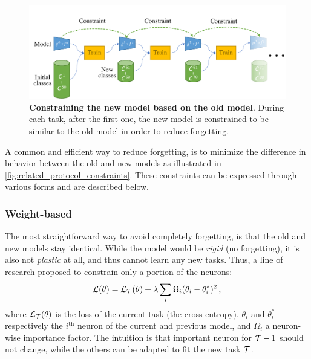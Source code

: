 \begin{figure}[tb]
      \begin{center}
            \includegraphics[width=1.0\linewidth]{images/related/constraints}
      \end{center}
      \caption{\textbf{Constraining the new model based on the old model}. During each task, after
            the first one, the new model is constrained to be similar to the old model in order to reduce
            forgetting.}
      \label{fig:related_protocol_constraints}
\end{figure}

A common and efficient way to reduce forgetting, is to minimize the difference in behavior between
the old and new models as illustrated in \autoref{fig:related_protocol_constraints}. These constraints can be
expressed through various forms and are described below.

\subsubsection{Weight-based}
\label{sec:related_regul_weight}


The most straightforward way to avoid completely forgetting, is that the old and new
models stay identical. While the model would be \textit{rigid} (no forgetting), it is also not
\textit{plastic} at all, and thus cannot learn any new tasks. Thus, a line of research proposed to
constrain only a portion of the neurons:
%
\begin{equation}
      \mathcal{L}(\theta) = \mathcal{L}_{\mathcal{T}}(\theta) + \lambda \sum_i \Omega_i (\theta_i - \theta_i^*)^2\,,
      \label{eq:related_weight_constraint}
\end{equation}
%
where $\mathcal{L}_{\mathcal{T}}(\theta)$ is the loss of the current task (\eg the cross-entropy), $\theta_i$ and
$\theta_i^*$ respectively the $i^\text{th}$ neuron of the current and previous model, and $\Omega_i$
a neuron-wise importance factor. The intuition is that important neuron for $\mathcal{T}-1$ should not
change, while the others can be adapted to fit the new task $\mathcal{T}$.

